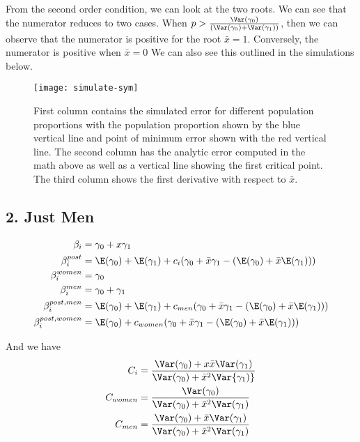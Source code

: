 From the second order condition, we can look at the two roots. We can see that the numerator reduces to two cases. When $p > \frac{\Var(\gamma_0)}{(\Var(\gamma_0) + \Var(\gamma_1))}$, then we can observe that the numerator is positive for the root $\bar{x} = 1$. Conversely, the numerator is positive when  $\bar{x} = 0$
We can also see this outlined in the simulations below.
\begin{figure}[ht!]
	\label{fig:simulate-sym}
  \centering
	\texttt{[image: simulate-sym]}
	\caption{First column contains the simulated error for different population proportions with the population proportion shown by the blue vertical line and point of minimum error shown with the red vertical line. The second column has the analytic error computed in the math above as well as a vertical line showing the first critical point. The third column shows the first derivative with respect to $\bar{x}$.} 
\end{figure}





\subsection*{2. Just Men}

\begin{align*}
	\beta_i &= \gamma_0 + x \gamma_1 \\
	\beta_{i}^{post} &= \E(\gamma_0) + \E(\gamma_1)  + c_i ( \gamma_0 + \bar{x} \gamma_1 - (\E(\gamma_0) + \bar{x} \E(\gamma_1))) \\
	\beta_i^{women} &= \gamma_0 \\
	\beta_i^{men} &= \gamma_0 + \gamma_1 \\
	\beta_i^{post,men} &= \E(\gamma_0) + \E(\gamma_1)  + c_{men} ( \gamma_0 + \bar{x} \gamma_1 - (\E(\gamma_0) + \bar{x} \E(\gamma_1))) \\
	\beta_i^{post, women} &= \E(\gamma_0) +  c_{women} ( \gamma_0 + \bar{x} \gamma_1 - (\E(\gamma_0) + \bar{x} \E(\gamma_1))) \\
\end{align*} 

And we have
\begin{align*}
	C_i &= \frac{\Var(\gamma_0) + x \bar{x} \Var(\gamma_1)}{\Var(\gamma_0) + \bar{x}^2 \Var{\gamma_1)}} \\
	C_{women} &= \frac{\Var(\gamma_0)}{\Var(\gamma_0) + \bar{x}^2 \Var(\gamma_1)} \\
	C_{men} &= \frac{\Var(\gamma_0) + \bar{x} \Var(\gamma_1)}{\Var(\gamma_0) + \bar{x}^2 \Var(\gamma_1)}
\end{align*} 

